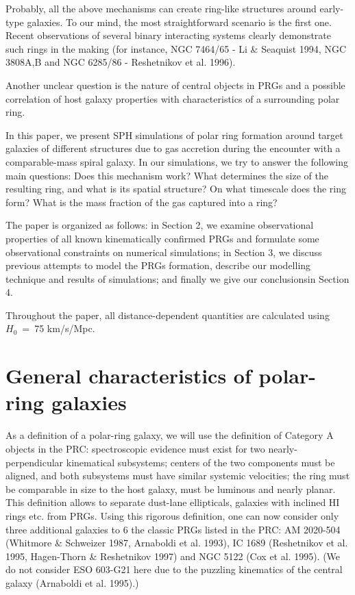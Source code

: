 Probably, all the above mechanisms can create ring-like 
structures around early-type galaxies. To our mind, 
the most straightforward scenario is the first one. Recent
observations of several binary interacting systems clearly
demonstrate such rings in the making (for instance, NGC 7464/65 - 
Li \& Seaquist 1994, 
NGC 3808A,B and NGC 6285/86 - Reshetnikov et al. 1996).
 
Another unclear question is the nature of central objects in PRGs
and a possible correlation of host galaxy properties with
characteristics of a surrounding polar ring. 

In this paper, we present SPH simulations of polar ring formation 
around target galaxies of different structures due to gas 
accretion during the encounter
with a comparable-mass spiral galaxy. In our simulations, we
try to answer the following main questions: 
Does this mechanism work? 
What determines the size of the resulting ring, and what is its 
spatial structure? 
On what timescale does the ring form?
What is the mass fraction of the gas captured into a ring? 
      
The paper is organized as follows: in Section 2, we examine
observational properties of all known kinematically confirmed
PRGs and formulate some observational constraints on numerical 
simulations; in Section 3, we discuss previous attempts
to model the PRGs formation, describe our modelling technique and
results of simulations; and finally we give our conclusionsin Section 4.

Throughout the paper, all distance-dependent quantities are
calculated using $H_{0}~=~$75 km/s/Mpc.

\section{General characteristics of polar-ring galaxies}

As a definition of a polar-ring galaxy, we will use the definition
of Category A objects in the PRC: spectroscopic evidence must
exist for two nearly-perpendicular kinematical subsystems;
centers of the two components must be aligned, and 
both subsystems must have similar systemic velocities;
the ring must be comparable in size to the host galaxy, must
be luminous and nearly planar. This definition allows to separate
dust-lane ellipticals, galaxies with inclined HI rings etc.
from PRGs.
Using this rigorous definition, one can now consider only three 
additional galaxies to 6 the classic PRGs listed in the PRC:
AM 2020-504 (Whitmore \& Schweizer 1987, Arnaboldi et al. 1993),
IC 1689 (Reshetnikov et al. 1995, Hagen-Thorn \& Reshetnikov 1997)
and NGC 5122 (Cox et al. 1995). (We do not consider ESO 603-G21 
here due to the puzzling kinematics of the central galaxy (Arnaboldi
et al. 1995).)

